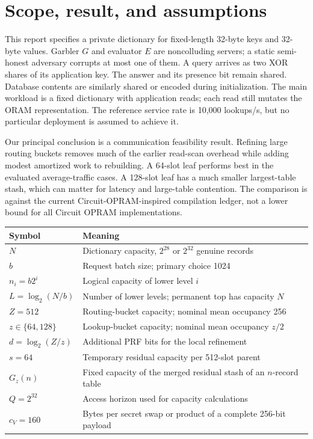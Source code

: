 \documentclass[11pt]{article}
\begin{document}
\clearpage
{\small\setlength{\parskip}{0pt}\tableofcontents}
\clearpage

\section{Scope, result, and assumptions}
This report specifies a private dictionary for fixed-length 32-byte keys and
32-byte values. Garbler $G$ and evaluator $E$ are noncolluding servers; a
static semi-honest adversary corrupts at most one of them. A query arrives as
two XOR shares of its application key. The answer and its presence bit remain
shared. Database contents are similarly shared or encoded during initialization.
The main workload is a fixed dictionary with application reads; each read
still mutates the ORAM representation. The reference service rate is
10,000 lookups/s, but no particular deployment is assumed to achieve it.

Our principal conclusion is a communication feasibility result. Refining
large routing buckets removes much of the earlier read-scan overhead while
adding modest amortized work to rebuilding. A 64-slot leaf performs best
in the evaluated average-traffic cases. A 128-slot leaf has a much smaller
largest-table stash, which can matter for latency and large-table contention.
The comparison is against the current Circuit-OPRAM-inspired compilation
ledger, not a lower bound for all Circuit OPRAM implementations.

\begin{center}\small
\begin{tabularx}{\linewidth}{lX}\toprule
Symbol & Meaning\\\midrule
$N$ & Dictionary capacity, $2^{28}$ or $2^{32}$ genuine records\\
$b$ & Request batch size; primary choice 1024\\
$n_i=b2^i$ & Logical capacity of lower level $i$\\
$L=\log_2(N/b)$ & Number of lower levels; permanent top has capacity $N$\\
$Z=512$ & Routing-bucket capacity; nominal mean occupancy 256\\
$z\in\{64,128\}$ & Lookup-bucket capacity; nominal mean occupancy $z/2$\\
$d=\log_2(Z/z)$ & Additional PRF bits for the local refinement\\
$s=64$ & Temporary residual capacity per 512-slot parent\\
$G_z(n)$ & Fixed capacity of the merged residual stash of an $n$-record table\\
$Q=2^{32}$ & Access horizon used for capacity calculations\\
$c_V=160$ & Bytes per secret swap or product of a complete 256-bit payload\\
\bottomrule\end{tabularx}
\end{center}
\end{document}
